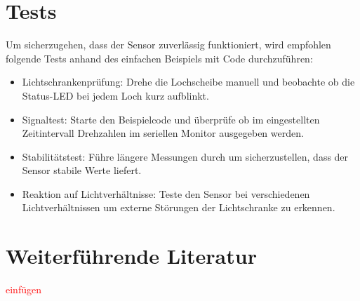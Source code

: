 \section{Tests}

Um sicherzugehen, dass der Sensor zuverlässig funktioniert, wird empfohlen folgende Tests anhand des einfachen Beispiels mit Code durchzuführen:

\begin{itemize}
	\item Lichtschrankenprüfung: Drehe die Lochscheibe manuell und beobachte ob die Status-LED bei jedem Loch kurz aufblinkt.
	\item Signaltest: Starte den Beispielcode und überprüfe ob im eingestellten Zeitintervall Drehzahlen im seriellen Monitor ausgegeben werden.
	\item Stabilitätstest: Führe längere Messungen durch um sicherzustellen, dass der Sensor stabile Werte liefert.
	\item Reaktion auf Lichtverhältnisse: Teste den Sensor bei verschiedenen Lichtverhältnissen um externe Störungen der Lichtschranke zu erkennen.
\end{itemize}

\section{Weiterführende Literatur}

\textcolor{red}{einfügen}

